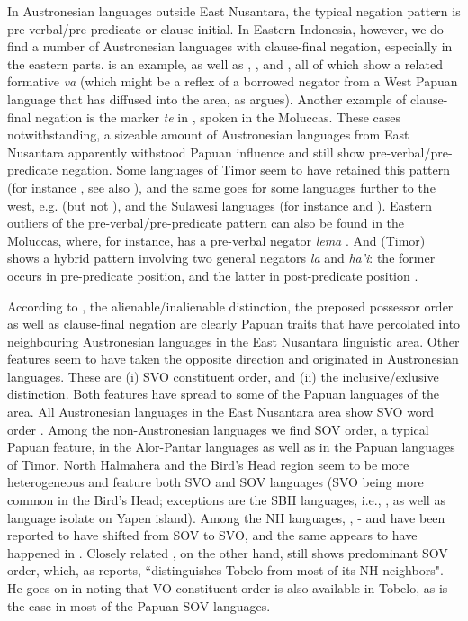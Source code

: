 In Austronesian languages outside East Nusantara, the typical negation pattern is pre-verbal/pre-predicate or clause-initial. In Eastern Indonesia, however, we do find a number of Austronesian languages with clause-final negation, especially in the eastern parts.  is an example, as well as , , and  \citep{gasser2014windesi}, all of which show a related formative \textit{va} (which might be a reflex of a borrowed negator from a West Papuan language that has diffused into the area, as \citet{reesink2002eastern} argues). Another example of clause-final negation is the marker \textit{te} in , spoken in the Moluccas. These cases notwithstanding, a sizeable amount of Austronesian languages from East Nusantara apparently withstood Papuan influence and still show pre-verbal/pre-predicate negation. Some languages of Timor seem to have retained this pattern (for instance , see also \citealt[132]{klamer2008east}), and the same goes for some languages further to the west, e.g.  (but not ), and the Sulawesi languages (for instance  and ). Eastern outliers of the pre-verbal/pre-predicate pattern can also be found in the Moluccas, where, for instance,  has a pre-verbal negator \textit{lema} \citep[140]{coward2005}. And  (Timor) shows a hybrid pattern involving two general negators \textit{la} and \textit{ha'i}: the former occurs in pre-predicate position, and the latter in post-predicate position \citep[228]{vanklinken1999grammar}.

According to \citet{klamer2008east}, the alienable/inalienable distinction, the preposed possessor order as well as clause-final negation are clearly Papuan traits that have percolated into neighbouring Austronesian languages in the East Nusantara linguistic area. Other features seem to have taken the opposite direction and originated in Austronesian languages. These are (i) SVO constituent order, and (ii) the inclusive/exlusive distinction. Both features have spread to some of the Papuan languages of the area. All Austronesian languages in the East Nusantara area show SVO word order \citep[113]{klamer2008east}. Among the non-Austronesian languages we find SOV order, a typical Papuan feature, in the Alor-Pantar languages as well as in the Papuan languages of Timor. North Halmahera and the Bird's Head region seem to be more heterogeneous and feature both SVO and SOV languages (SVO being more common in the Bird's Head; exceptions are the SBH languages, i.e., , as well as language isolate  on Yapen island). Among the NH languages, , - and  have been reported to have shifted from SOV to SVO, and the same appears to have happened in  \citep[114]{klamer2008east}. Closely related , on the other hand, still shows predominant SOV order, which, as \citet[55]{holton2003tobelo} reports, ``distinguishes Tobelo from most of its NH neighbors". He goes on in noting that VO constituent order is also available in Tobelo, as is the case in most of the Papuan SOV languages.

